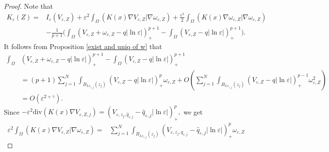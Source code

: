 \documentclass[12pt,reqno]{amsart}
\numberwithin{equation}{section}
\theoremstyle{definition}
\theoremstyle{remark}
\begin{document}
\begin{proof}
Note  that
\begin{equation*}
\begin{split}
K_{\varepsilon}(Z)=&I_\varepsilon(V_{\varepsilon,Z})+\varepsilon^2\int_{\Omega}\left( K(x)\nabla V_{\varepsilon,Z}|\nabla \omega_{\varepsilon,Z}\right) +\frac{\varepsilon^2}{2}\int_{\Omega}\left( K(x)\nabla \omega_{\varepsilon,Z}|\nabla \omega_{\varepsilon,Z}\right)\\
&-\frac{1}{p+1}\bigg( \int_{\Omega}\left (V_{\varepsilon,Z}+\omega_{\varepsilon,Z}-q|\ln\varepsilon|\right )^{p+1}_+-\int_{\Omega}\left (V_{\varepsilon,Z}-q|\ln\varepsilon|\right )^{p+1}_+\bigg).
\end{split}
\end{equation*}
It follows from Proposition \ref{exist and uniq of w} that
\begin{equation*}
\begin{split}
\int_{\Omega}&\left (V_{\varepsilon,Z}+\omega_{\varepsilon,Z}-q|\ln\varepsilon|\right )^{p+1}_+-\int_{\Omega}\left (V_{\varepsilon,Z}-q|\ln\varepsilon|\right )^{p+1}_+\\
&=(p+1)\sum_{j=1}^N\int_{B_{Ls_{\varepsilon,j}}(z_j)}\left (V_{\varepsilon,Z}-q|\ln\varepsilon|\right )^{p}_+\omega_{\varepsilon,Z}
+O\left( \sum_{j=1}^N\int_{B_{Ls_{\varepsilon,j}}(z_j)}\left (V_{\varepsilon,Z}-q|\ln\varepsilon|\right )^{p-1}_+\omega_{\varepsilon,Z}^2\right)\\
&=O\left( \varepsilon^{2+\gamma}\right).
\end{split}
\end{equation*}
Since $  -\varepsilon^2\text{div}(K(x)\nabla V_{\varepsilon, Z,j})=\left (V_{\varepsilon,z_j,\hat{q}_{\varepsilon,j}}-\hat{q}_{\varepsilon,j}|\ln\varepsilon|\right )^p_+, $
we get
\begin{equation*}
\begin{split}
\varepsilon^2\int_{\Omega}\left( K(x)\nabla V_{\varepsilon,Z}|\nabla \omega_{\varepsilon,Z}\right)
=&\sum_{j=1}^N\int_{B_{Ls_{\varepsilon,j}}(z_j)}\left (V_{\varepsilon,z_j,\hat{q}_{\varepsilon,j}}-\hat{q}_{\varepsilon,j}|\ln\varepsilon|\right )^p_+\omega_{\varepsilon,Z}

\end{split}
\end{equation*}
\end{proof}
\end{document}
